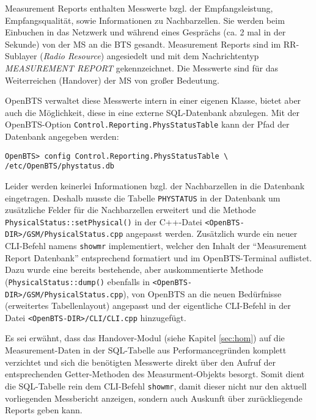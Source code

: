 Measurement Reports enthalten Messwerte bzgl. der Empfangsleistung, Empfangsqualität, sowie Informationen zu Nachbarzellen. Sie werden beim Einbuchen in das Netzwerk und während eines Gesprächs (ca. 2 mal in der Sekunde) von der MS an die BTS gesandt. Measurement Reports sind im RR-Sublayer (\textit{Radio Resource}) angesiedelt und mit dem Nachrichtentyp \textit{MEASUREMENT REPORT} gekennzeichnet. Die Messwerte sind für das Weiterreichen (Handover) der MS von großer Bedeutung.

OpenBTS verwaltet diese Messwerte intern in einer eigenen Klasse, bietet aber auch die Möglichkeit, diese in eine externe SQL-Datenbank abzulegen. Mit der OpenBTS-Option \verb|Control.Reporting.PhysStatusTable| kann der Pfad der Datenbank angegeben werden:
\begin{verbatim}
OpenBTS> config Control.Reporting.PhysStatusTable \
/etc/OpenBTS/phystatus.db
\end{verbatim}

Leider werden keinerlei Informationen bzgl. der Nachbarzellen in die Datenbank eingetragen. Deshalb musste die Tabelle \verb|PHYSTATUS| in der Datenbank um zusätzliche Felder für die Nachbarzellen erweitert und die Methode \verb|PhysicalStatus::setPhysical()| in der C++-Datei \verb|<OpenBTS-DIR>/GSM/PhysicalStatus.cpp| angepasst werden.
Zusätzlich wurde ein neuer CLI-Befehl namens \verb|showmr| implementiert, welcher den Inhalt der "`Measurement Report Datenbank"' entsprechend formatiert und im OpenBTS-Terminal auflistet. Dazu wurde eine bereits bestehende, aber auskommentierte Methode (\verb|PhysicalStatus::dump()| ebenfalls in \verb|<OpenBTS-DIR>/GSM/PhysicalStatus.cpp|), von OpenBTS an die neuen Bedürfnisse (erweitertes Tabellenlayout) angepasst und der eigentliche CLI-Befehl in der Datei \verb|<OpenBTS-DIR>/CLI/CLI.cpp| hinzugefügt.

Es sei erwähnt, dass das Handover-Modul (siehe Kapitel \ref{sec:hom}) auf die Measurement-Daten in der SQL-Tabelle  aus Performancegründen komplett verzichtet und sich die benötigten Messwerte direkt über den Aufruf der entsprechenden Getter-Methoden des Measurment-Objekts besorgt. Somit dient die SQL-Tabelle rein dem CLI-Befehl \verb|showmr|, damit dieser nicht nur den aktuell vorliegenden Messbericht anzeigen, sondern auch Auskunft über zurückliegende Reports geben kann.

